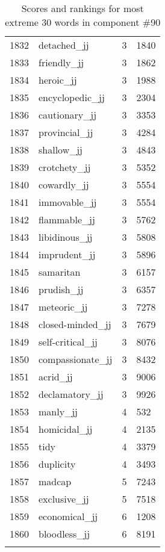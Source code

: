 \begin{longtable}[!htbp]{| rlr@{.}l |}
    1832 & detached\_jj & 3 & 1840 \\
    1833 & friendly\_jj & 3 & 1862 \\
    1834 & heroic\_jj & 3 & 1988 \\
    1835 & encyclopedic\_jj & 3 & 2304 \\
    1836 & cautionary\_jj & 3 & 3353 \\
    1837 & provincial\_jj & 3 & 4284 \\
    1838 & shallow\_jj & 3 & 4843 \\
    1839 & crotchety\_jj & 3 & 5352 \\
    1840 & cowardly\_jj & 3 & 5554 \\
    1841 & immovable\_jj & 3 & 5554 \\
    1842 & flammable\_jj & 3 & 5762 \\
    1843 & libidinous\_jj & 3 & 5808 \\
    1844 & imprudent\_jj & 3 & 5896 \\
    1845 & samaritan & 3 & 6157 \\
    1846 & prudish\_jj & 3 & 6357 \\
    1847 & meteoric\_jj & 3 & 7278 \\
    1848 & closed-minded\_jj & 3 & 7679 \\
    1849 & self-critical\_jj & 3 & 8076 \\
    1850 & compassionate\_jj & 3 & 8432 \\
    1851 & acrid\_jj & 3 & 9006 \\
    1852 & declamatory\_jj & 3 & 9926 \\
    1853 & manly\_jj & 4 & 532 \\
    1854 & homicidal\_jj & 4 & 2135 \\
    1855 & tidy & 4 & 3379 \\
    1856 & duplicity & 4 & 3493 \\
    1857 & madcap & 5 & 7243 \\
    1858 & exclusive\_jj & 5 & 7518 \\
    1859 & economical\_jj & 6 & 1208 \\
    1860 & bloodless\_jj & 6 & 8191 \\
    \hline
    \caption{Scores and rankings for most extreme 30 words in component \#90} \\
\end{longtable}
